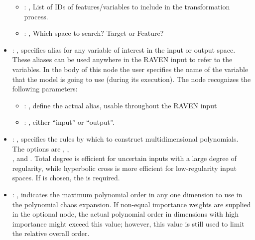 \begin{itemize}
\begin{itemize}
        \item {}: , 
          List of IDs of features/variables to include in the transformation process.

        \item {}: , 
          Which space to search? Target or Feature?
      \end{itemize}

    \item {}: , 
      specifies alias for         any variable of interest in the input or output space. These
      aliases can be used anywhere in the RAVEN input to         refer to the variables. In the body
      of this node the user specifies the name of the variable that the model is going to use
      (during its execution).
      The  node recognizes the following parameters:
        \begin{itemize}
          \item {}: , 
            define the actual alias, usable throughout the RAVEN input
          \item {}: , 
            either ``input'' or ``output''.
      \end{itemize}

    \item {}: , 
      specifies the rules by which to construct multidimensional polynomials.  The options are
      , ,\\
      , and .
      Total degree is efficient for                                                  uncertain
      inputs with a large degree of regularity, while hyperbolic cross is more efficient
      for low-regularity input spaces.                                                  If
       is chosen, the  is required.

    \item {}: , 
      indicates the maximum polynomial order in any one dimension to use in the
      polynomial chaos expansion. \nb If non-equal importance weights are supplied in the optional
       node, the actual polynomial order in dimensions with high
      importance might exceed this value; however, this value is still used to limit the
      relative overall order.


\end{itemize}
